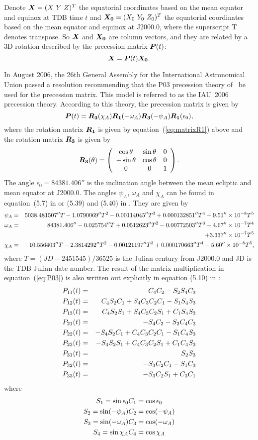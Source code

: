 \documentclass[12pt]{article}
\newcommand \beq {\begin{equation}}
\newcommand \eeq {\end{equation}}
\newcommand \beqn {\begin{eqnarray}}
\newcommand \eeqn {\end{eqnarray}}
\newcommand{\ve}[1]{\mbox{\boldmath $#1$}}
\newcommand{\kaplan}{\cite{kaplan05}}
\newcommand{\iers}{\cite{iers2010}}
\begin{document}
\begin{CJK}{UTF8}{bkai}
Denote $\ve{X}=(X\ Y\ Z)^T$ the equatorial coordinates based on 
the mean equator and equinox at TDB time $t$ and $\ve{X_0}=(X_0\ Y_0\ Z_0)^T$ 
the equatorial coordinates based on the mean equator and equinox at J2000.0,
where the superscript T denotes transpose. So $\ve{X}$ and $\ve{X_0}$ are column 
vectors, and they are related by a 3D rotation described by the precession matrix 
$\ve{P}(t)$: 
\beq
  \ve{X} = \ve{P}(t) \ve{X_0} . 
\eeq

In August 2006, the 26th General Assembly for the International Astronomical Union 
passed a resolution recommending that the P03 precession theory of~\cite{capitaine03}
be used for the precession matrix. 
This model is referred to as the IAU~2006 precession theory.
According to this theory, the precession matrix is given by 
\beq
  \ve{P}(t) = \ve{R_3}(\chi_A) \ve{R_1}(-\omega_A) \ve{R_3}(-\psi_A) \ve{R_1}(\epsilon_0) ,
\label{eq:P03}
\eeq
where the rotation matrix $\ve{R_1}$ is given by equation~(\ref{eq:matrixR1}) above 
and the rotation matrix $\ve{R_3}$ is given by 
\beq
  \ve{R_3}(\theta) = \left( \begin{array}{ccc} 
\cos \theta & \sin \theta & 0 \\ 
-\sin \theta & \cos \theta & 0 \\ 
0 & 0 & 1 \end{array} \right) .
\label{eq:matrixR3}
\eeq
The angle $\epsilon_0 = 84381.406''$ is the inclination angle between the mean ecliptic and 
mean equator at J2000.0. The angles $\psi_A$, $\omega_A$ and $\chi_A$ can be found 
in equation~(5.7) in \kaplan or (5.39) and (5.40) in \iers.
They are given by 
\beqn
  \psi_A &=& 5038.481507'' T - 1.0790069'' T^2 - 0.00114045'' T^3 
+ 0.000132851'' T^4 - 9.51''\times 10^{-8} T^5 \cr 
  \omega_A &=& 84381.406'' - 0.025754'' T + 0.0512623'' T^2 - 0.00772503'' T^3 
- 4.67''\times 10^{-7} T^4 \cr && + 3.337'' \times 10^{-7} T^5 \label{eq:precessionAngles} \\ 
  \chi_A &=& 10.556403'' T - 2.3814292'' T^2 - 0.00121197'' T^3 + 0.000170663'' T^4 
- 5.60'' \times 10^{-8} T^5 ,  \nonumber
\eeqn
where $T=(JD - 2451545)/36525$ is the Julian century from J2000.0 and JD is the 
TDB Julian date number. The result of the matrix multiplication in equation~(\ref{eq:P03}) 
is also written out explicitly in equation (5.10) in \kaplan: 
\beqn
  P_{11}(t) &=& C_4 C_2 - S_2 S_4 C_3 \cr
  P_{12}(t) &=& C_4 S_2 C_1 + S_4 C_3 C_2 C_1 - S_1 S_4 S_3 \cr
  P_{13}(t) &=& C_4 S_2 S_1 + S_4 C_3 C_2 S_1 + C_1 S_4 S_3 \cr 
  P_{21}(t) &=& -S_4 C_2 - S_2 C_4 C_3 \cr 
  P_{22}(t) &=& -S_4 S_2 C_1 + C_4 C_3 C_2 C_1 - S_1 C_4 S_3 \label{eq:matP} \\
  P_{23}(t) &=& -S_4 S_2 S_1 + C_4 C_3 C_2 S_1 + C_1 C_4 S_3 \cr 
  P_{31}(t) &=& S_2 S_3 \cr 
  P_{32}(t) &=& -S_3 C_2 C_1 - S_1 C_3 \cr 
  P_{33}(t) &=& -S_3 C_2 S_1 + C_3 C_1 \nonumber
\eeqn
where 
\beqn
  S_1 = \sin \epsilon_0 & C_1 = \cos \epsilon_0 \cr 
  S_2 = \sin (-\psi_A) & C_2 = \cos (-\psi_A) \label{def:S1234} \\ 
  S_3 = \sin (-\omega_A) & C_3 = \cos (-\omega_A) \cr 
  S_4 = \sin \chi_A & C_4 = \cos \chi_A  \nonumber
\eeqn


\end{CJK}
\end{document}
